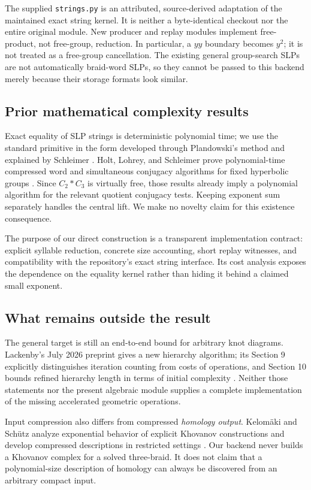\documentclass[11pt,letterpaper]{article}
\theoremstyle{definition}\newtheorem{definition}[theorem]{Definition}
\theoremstyle{remark}\newtheorem{remark}[theorem]{Remark}
\begin{document}
The supplied \texttt{strings.py} is an attributed, source-derived adaptation of the maintained exact string kernel. It is neither a byte-identical checkout nor the entire original module. New producer and replay modules implement free-product, not free-group, reduction. In particular, a $y y$ boundary becomes $y^2$; it is not treated as a free-group cancellation. The existing general group-search SLPs are not automatically braid-word SLPs, so they cannot be passed to this backend merely because their storage formats look similar.

\subsection{Prior mathematical complexity results}
Exact equality of SLP strings is deterministic polynomial time; we use the standard primitive in the form developed through Plandowski's method and explained by Schleimer \cite{schleimer}. Holt, Lohrey, and Schleimer prove polynomial-time compressed word and simultaneous conjugacy algorithms for fixed hyperbolic groups \cite{hls}. Since $C_2*C_3$ is virtually free, those results already imply a polynomial algorithm for the relevant quotient conjugacy tests. Keeping exponent sum separately handles the central lift. We make no novelty claim for this existence consequence.

The purpose of our direct construction is a transparent implementation contract: explicit syllable reduction, concrete size accounting, short replay witnesses, and compatibility with the repository's exact string interface. Its cost analysis exposes the dependence on the equality kernel rather than hiding it behind a claimed small exponent.

\subsection{What remains outside the result}
The general target is still an end-to-end bound for arbitrary knot diagrams. Lackenby's July 2026 preprint gives a new hierarchy algorithm; its Section 9 explicitly distinguishes iteration counting from costs of operations, and Section 10 bounds refined hierarchy length in terms of initial complexity \cite{lackenby}. Neither those statements nor the present algebraic module supplies a complete implementation of the missing accelerated geometric operations.

Input compression also differs from compressed \emph{homology output}. Kelom\"aki and Sch\"utz analyze exponential behavior of explicit Khovanov constructions and develop compressed descriptions in restricted settings \cite{ks}. Our backend never builds a Khovanov complex for a solved three-braid. It does not claim that a polynomial-size description of homology can always be discovered from an arbitrary compact input.
\end{document}
